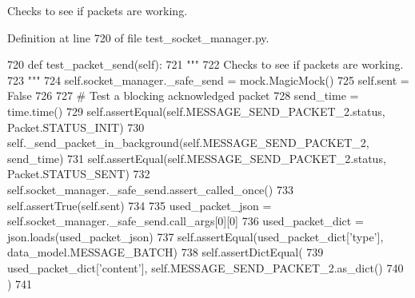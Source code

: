 \begin{DoxyVerb}Checks to see if packets are working.
\end{DoxyVerb}
 

Definition at line 720 of file test\+\_\+socket\+\_\+manager.\+py.


\begin{DoxyCode}
720     \textcolor{keyword}{def }test\_packet\_send(self):
721         \textcolor{stringliteral}{"""}
722 \textcolor{stringliteral}{        Checks to see if packets are working.}
723 \textcolor{stringliteral}{        """}
724         self.socket\_manager.\_safe\_send = mock.MagicMock()
725         self.sent = \textcolor{keyword}{False}
726 
727         \textcolor{comment}{# Test a blocking acknowledged packet}
728         send\_time = time.time()
729         self.assertEqual(self.MESSAGE\_SEND\_PACKET\_2.status, Packet.STATUS\_INIT)
730         self.\_send\_packet\_in\_background(self.MESSAGE\_SEND\_PACKET\_2, send\_time)
731         self.assertEqual(self.MESSAGE\_SEND\_PACKET\_2.status, Packet.STATUS\_SENT)
732         self.socket\_manager.\_safe\_send.assert\_called\_once()
733         self.assertTrue(self.sent)
734 
735         used\_packet\_json = self.socket\_manager.\_safe\_send.call\_args[0][0]
736         used\_packet\_dict = json.loads(used\_packet\_json)
737         self.assertEqual(used\_packet\_dict[\textcolor{stringliteral}{'type'}], data\_model.MESSAGE\_BATCH)
738         self.assertDictEqual(
739             used\_packet\_dict[\textcolor{stringliteral}{'content'}], self.MESSAGE\_SEND\_PACKET\_2.as\_dict()
740         )
741 
\end{DoxyCode}
\mbox{\label{classparlai_1_1mturk_1_1core_1_1dev_1_1test_1_1test__socket__manager_1_1TestSocketManagerRoutingFunctionality_a9403b843beeef51f5eba050796862f9e}} 
